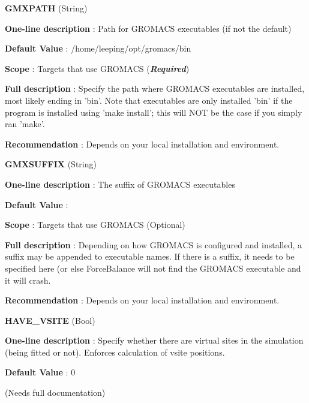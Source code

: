 \begin{DoxyItemize}
\item {\bfseries  \-G\-M\-X\-P\-A\-T\-H } (\-String) \par
{\bfseries  \-One-\/line description }\-: \-Path for \-G\-R\-O\-M\-A\-C\-S executables (if not the default) \par
{\bfseries  \-Default \-Value }\-: /home/leeping/opt/gromacs/bin \par
{\bfseries  \-Scope }\-: \-Targets that use \-G\-R\-O\-M\-A\-C\-S ({\bfseries {\itshape \-Required\/}}) \par
{\bfseries  \-Full description }\-: \-Specify the path where \-G\-R\-O\-M\-A\-C\-S executables are installed, most likely ending in 'bin'. \-Note that executables are only installed 'bin' if the program is installed using 'make install'; this will \-N\-O\-T be the case if you simply ran 'make'. \par
{\bfseries  \-Recommendation }\-: \-Depends on your local installation and environment.\end{DoxyItemize}
\begin{DoxyItemize}
\item {\bfseries  \-G\-M\-X\-S\-U\-F\-F\-I\-X } (\-String) \par
{\bfseries  \-One-\/line description }\-: \-The suffix of \-G\-R\-O\-M\-A\-C\-S executables \par
{\bfseries  \-Default \-Value }\-: \par
{\bfseries  \-Scope }\-: \-Targets that use \-G\-R\-O\-M\-A\-C\-S (\-Optional) \par
{\bfseries  \-Full description }\-: \-Depending on how \-G\-R\-O\-M\-A\-C\-S is configured and installed, a suffix may be appended to executable names. \-If there is a suffix, it needs to be specified here (or else \-Force\-Balance will not find the \-G\-R\-O\-M\-A\-C\-S executable and it will crash. \par
{\bfseries  \-Recommendation }\-: \-Depends on your local installation and environment.\end{DoxyItemize}
\begin{DoxyItemize}
\item {\bfseries  \-H\-A\-V\-E\-\_\-\-V\-S\-I\-T\-E } (\-Bool) \par
{\bfseries  \-One-\/line description }\-: \-Specify whether there are virtual sites in the simulation (being fitted or not). \-Enforces calculation of vsite positions. \par
{\bfseries  \-Default \-Value }\-: 0 \par
(\-Needs full documentation)\end{DoxyItemize}
